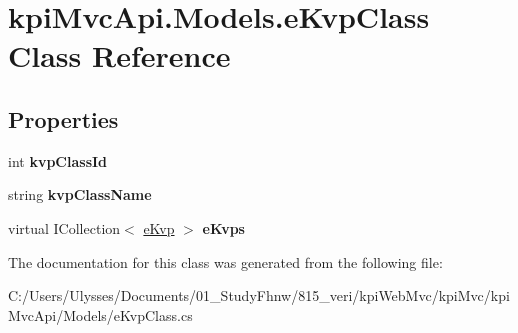 \hypertarget{classkpi_mvc_api_1_1_models_1_1e_kvp_class}{}\section{kpi\+Mvc\+Api.\+Models.\+e\+Kvp\+Class Class Reference}
\label{classkpi_mvc_api_1_1_models_1_1e_kvp_class}
\subsection*{Properties}
\begin{DoxyCompactItemize}
\item 
\mbox{\label{classkpi_mvc_api_1_1_models_1_1e_kvp_class_a7ac3bfff016e0b0121f263fa64f37c62}} 
int {\bfseries kvp\+Class\+Id}
\item 
\mbox{\label{classkpi_mvc_api_1_1_models_1_1e_kvp_class_aec8b691ef5964ff4debf2bce8dcb10c0}} 
string {\bfseries kvp\+Class\+Name}
\item 
\mbox{\label{classkpi_mvc_api_1_1_models_1_1e_kvp_class_a6e00a631be68d6e6e5a130024b0cdc9b}} 
virtual I\+Collection$<$ \hyperlink{classkpi_mvc_api_1_1_models_1_1e_kvp}{e\+Kvp} $>$ {\bfseries e\+Kvps}
\end{DoxyCompactItemize}


The documentation for this class was generated from the following file\+:\begin{DoxyCompactItemize}
\item 
C\+:/\+Users/\+Ulysses/\+Documents/01\+\_\+\+Study\+Fhnw/815\+\_\+veri/kpi\+Web\+Mvc/kpi\+Mvc/kpi\+Mvc\+Api/\+Models/e\+Kvp\+Class.\+cs\end{DoxyCompactItemize}
